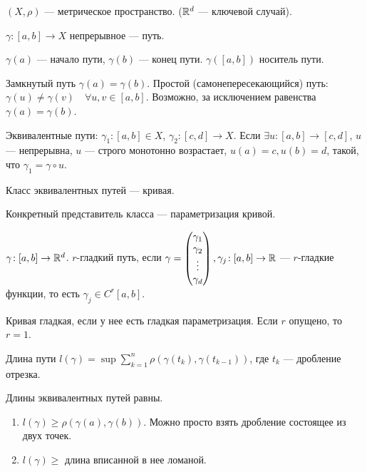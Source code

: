 \begin{definition}
    $(X, \rho)$ --- метрическое пространство.  ($\mathbb{R}^d$ --- ключевой случай).

    $\gamma\!: [a,b] \to X$ непрерывное --- путь.

     $\gamma(a)$ --- начало пути,  $\gamma(b)$ --- конец пути.  $\gamma([a, b])$ носитель пути.

     Замкнутый путь  $\gamma(a) = \gamma(b)$. Простой (самонепересекающийся) путь:  $\gamma(u) \neq \gamma(v) \quad \forall u, v \in [a, b]$. Возможно, за исключением равенства  $\gamma(a) = \gamma(b)$.
\end{definition}
\begin{definition}
    Эквивалентные пути: $\gamma_1\!:[a, b] \in X$, $\gamma_2\!: [c,d] \to X$. Если  $\exists u\!:[a, b] \to [c, d]$,  $u$ --- непрерывна,  $u$ --- строго монотонно возрастает,  $u(a) = c, u(b) = d$, такой, что  $\gamma_1 = \gamma \circ u$.
\end{definition}
\begin{definition}
    Класс эквивалентных путей --- кривая.

    Конкретный представитель класса --- параметризация кривой.
\end{definition}
\begin{definition}
    $\gamma\!: [a,b] \to \mathbb{R}^d$.  $r$-гладкий путь, если  $\gamma = \begin{pmatrix} \gamma_1 \\ \gamma_2 \\ \vdots \\ \gamma_d \end{pmatrix}, \gamma_j\!:[a,b] \to \mathbb{R}$ --- $r$-гладкие функции, то есть  $\gamma_j \in C^r[a,b]$.

    Кривая гладкая, если у нее есть гладкая параметризация. Если  $r$ опущено, то  $r=1$.
\end{definition}
\begin{definition}
    Длина пути $l(\gamma) = \sup \sum\limits_{k=1}^n \rho(\gamma(t_k), \gamma(t_{k-1}))$, где  $t_k$ --- дробление отрезка.
\end{definition}
\begin{remark}
    Длины эквивалентных путей равны.
\end{remark}
\begin{properties}
    \begin{enumerate}
        \item $l(\gamma) \ge \rho(\gamma(a), \gamma(b))$. Можно просто взять дробление состоящее из двух точек.
        \item $l(\gamma) \ge$ длина вписанной в нее ломаной.
    \end{enumerate}
\end{properties}
